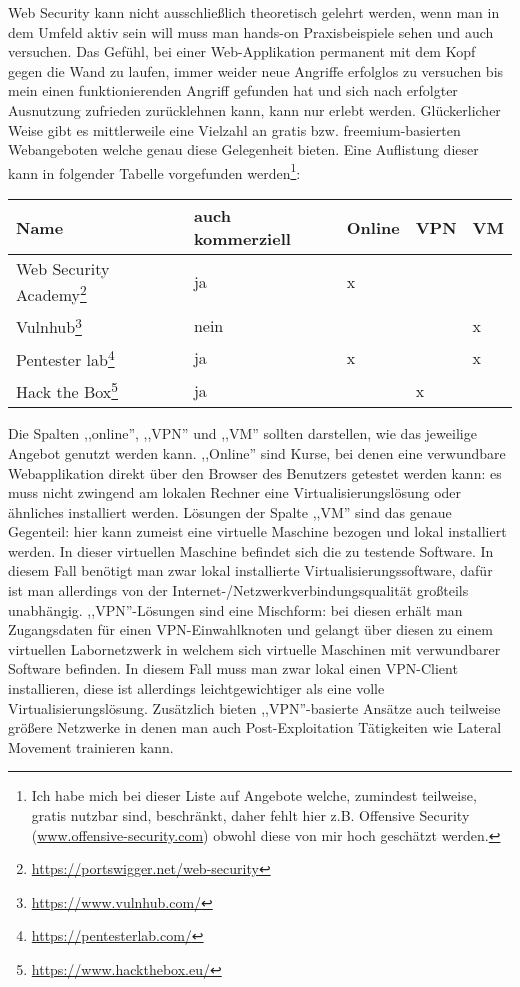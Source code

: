 Web Security kann nicht ausschließlich theoretisch gelehrt werden, wenn man in dem Umfeld aktiv sein will muss man hands-on Praxisbeispiele sehen und auch versuchen. Das Gefühl, bei einer Web-Applikation permanent mit dem Kopf gegen die Wand zu laufen, immer weider neue Angriffe erfolglos zu versuchen bis mein einen funktionierenden Angriff gefunden hat und sich nach erfolgter Ausnutzung zufrieden zurücklehnen kann, kann nur erlebt werden. Glückerlicher Weise gibt es mittlerweile eine Vielzahl an gratis bzw. freemium-basierten Webangeboten welche genau diese Gelegenheit bieten. Eine Auflistung dieser kann in folgender Tabelle vorgefunden werden\footnote{Ich habe mich bei dieser Liste auf Angebote welche, zumindest teilweise, gratis nutzbar sind, beschränkt, daher fehlt hier z.B. Offensive Security (\url{www.offensive-security.com}) obwohl diese von mir hoch geschätzt werden.}:


\begin{table}[h!]
	\begin{center}
\begin{tabular}{|l|l|lll|}
	\toprule
	Name & auch kommerziell & Online & VPN & VM \\
	\midrule
	Web Security Academy\footnote{\url{https://portswigger.net/web-security}}  & ja   & x &   &   \\
	Vulnhub\footnote{\url{https://www.vulnhub.com/}}              & nein &   &   & x \\
	Pentester lab\footnote{\url{https://pentesterlab.com/}}        & ja   & x &   & x \\
	Hack the Box\footnote{\url{https://www.hackthebox.eu/}}         & ja   & ~ & x &   \\
	\bottomrule
\end{tabular}
\end{center}
\end{table}

Die Spalten ,,online'', ,,VPN'' und ,,VM'' sollten darstellen, wie das jeweilige Angebot genutzt werden kann. ,,Online'' sind Kurse, bei denen eine verwundbare Webapplikation direkt über den Browser des Benutzers getestet werden kann: es muss nicht zwingend am lokalen Rechner eine Virtualisierungslösung oder ähnliches installiert werden. Lösungen der Spalte ,,VM'' sind das genaue Gegenteil: hier kann zumeist eine virtuelle Maschine bezogen und lokal installiert werden. In dieser virtuellen Maschine befindet sich die zu testende Software. In diesem Fall benötigt man zwar lokal installierte Virtualisierungssoftware, dafür ist man allerdings von der Internet-/Netzwerkverbindungsqualität großteils unabhängig. ,,VPN''-Lösungen sind eine Mischform: bei diesen erhält man Zugangsdaten für einen VPN-Einwahlknoten und gelangt über diesen zu einem virtuellen Labornetzwerk in welchem sich virtuelle Maschinen mit verwundbarer Software befinden. In diesem Fall muss man zwar lokal einen VPN-Client installieren, diese ist allerdings leichtgewichtiger als eine volle Virtualisierungslösung. Zusätzlich bieten ,,VPN''-basierte Ansätze auch teilweise größere Netzwerke in denen man auch Post-Exploitation Tätigkeiten wie Lateral Movement trainieren kann.

